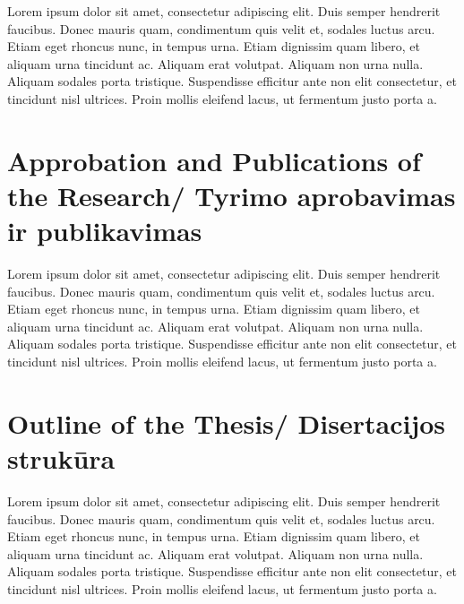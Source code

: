 Lorem ipsum dolor sit amet, consectetur adipiscing elit. Duis semper hendrerit faucibus. Donec mauris quam, condimentum quis velit et, sodales luctus arcu. Etiam eget rhoncus nunc, in tempus urna. Etiam dignissim quam libero, et aliquam urna tincidunt ac. Aliquam erat volutpat. Aliquam non urna nulla. Aliquam sodales porta tristique. Suspendisse efficitur ante non elit consectetur, et tincidunt nisl ultrices. Proin mollis eleifend lacus, ut fermentum justo porta a.


\section*{Approbation and Publications of the Research/ Tyrimo aprobavimas ir publikavimas} %

Lorem ipsum dolor sit amet, consectetur adipiscing elit. Duis semper hendrerit faucibus. Donec mauris quam, condimentum quis velit et, sodales luctus arcu. Etiam eget rhoncus nunc, in tempus urna. Etiam dignissim quam libero, et aliquam urna tincidunt ac. Aliquam erat volutpat. Aliquam non urna nulla. Aliquam sodales porta tristique. Suspendisse efficitur ante non elit consectetur, et tincidunt nisl ultrices. Proin mollis eleifend lacus, ut fermentum justo porta a.


\section*{Outline of the Thesis/ Disertacijos strukūra}

Lorem ipsum dolor sit amet, consectetur adipiscing elit. Duis semper hendrerit faucibus. Donec mauris quam, condimentum quis velit et, sodales luctus arcu. Etiam eget rhoncus nunc, in tempus urna. Etiam dignissim quam libero, et aliquam urna tincidunt ac. Aliquam erat volutpat. Aliquam non urna nulla. Aliquam sodales porta tristique. Suspendisse efficitur ante non elit consectetur, et tincidunt nisl ultrices. Proin mollis eleifend lacus, ut fermentum justo porta a.